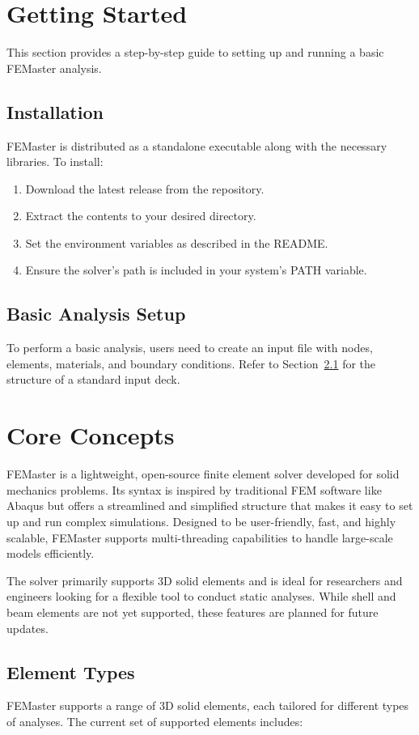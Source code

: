 \section{Getting Started}
This section provides a step-by-step guide to setting up and running a basic FEMaster analysis.

\subsection{Installation}
FEMaster is distributed as a standalone executable along with the necessary libraries. To install:
\begin{enumerate}
    \item Download the latest release from the repository.
    \item Extract the contents to your desired directory.
    \item Set the environment variables as described in the README.
    \item Ensure the solver's path is included in your system's PATH variable.
\end{enumerate}

\subsection{Basic Analysis Setup}
To perform a basic analysis, users need to create an input file with nodes, elements, materials, and boundary conditions. Refer to Section~\ref{sec:element_types} for the structure of a standard input deck.

\section{Core Concepts}
\label{sec:core_concepts}
FEMaster is a lightweight, open-source finite element solver developed for solid mechanics problems. Its syntax is inspired by traditional FEM software like Abaqus but offers a streamlined and simplified structure that makes it easy to set up and run complex simulations. Designed to be user-friendly, fast, and highly scalable, FEMaster supports multi-threading capabilities to handle large-scale models efficiently.

The solver primarily supports 3D solid elements and is ideal for researchers and engineers looking for a flexible tool to conduct static analyses. While shell and beam elements are not yet supported, these features are planned for future updates.

\subsection{Element Types}
\label{sec:element_types}
FEMaster supports a range of 3D solid elements, each tailored for different types of analyses. The current set of supported elements includes:

